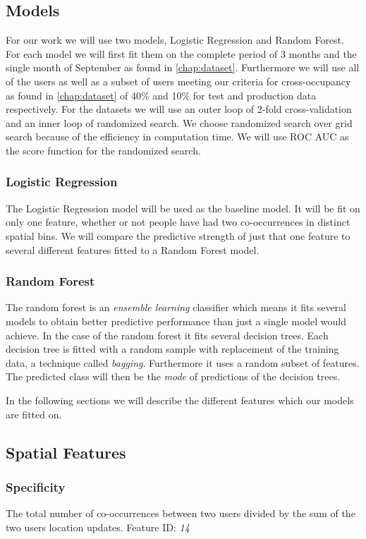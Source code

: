 \subsection{Models}
For our work we will use two models, Logistic Regression and Random Forest. For each model we will first fit them on the complete period of 3 months and the single month of September as found in \autoref{chap:dataset}. Furthermore we will use all of the users as well as a subset of users meeting our criteria for cross-occupancy as found in \autoref{chap:dataset} of 40\% and 10\% for test and production data respectively. For the datasets we will use an outer loop of 2-fold cross-validation and an inner loop of randomized search. We choose randomized search over grid search because of the efficiency in computation time. We will use ROC AUC as the score function for the randomized search.


\subsubsection{Logistic Regression}
The Logistic Regression model will be used as the baseline model. It will be fit on only one feature, whether or not people have had two co-occurrences in distinct spatial bins. We will compare the predictive strength of just that one feature to several different features fitted to a Random Forest model.

\subsubsection{Random Forest}
The random forest is an \textit{ensemble learning} classifier which means it fits several models to obtain better predictive performance than just a single model would achieve. In the case of the random forest it fits several decision trees. Each decision tree is fitted with a random sample with replacement of the training data, a technique called \textit{bagging}. Furthermore it uses a random subset of features. The predicted class will then be the \textit{mode} of predictions of the decision trees.

In the following sections we will describe the different features which our models are fitted on.

\subsection{Spatial Features}

\subsubsection{Specificity}
The total number of co-occurrences between two users divided by the sum of the two users location updates. Feature ID: \textit{14}

